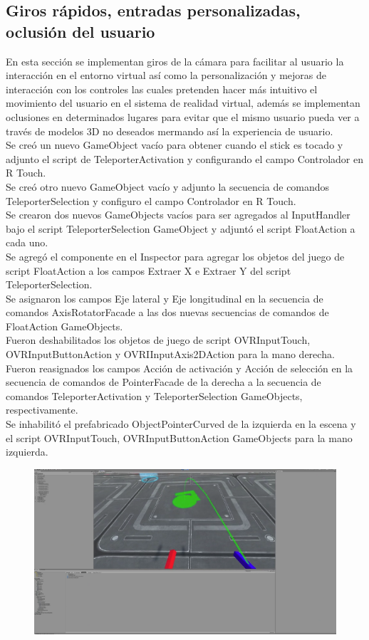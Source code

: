 \subsection{Giros rápidos, entradas personalizadas, oclusión del usuario}
En esta sección se implementan giros de la cámara para facilitar al usuario la interacción en el entorno virtual así como la personalización y mejoras de interacción 
con los controles las cuales pretenden hacer más intuitivo el movimiento del usuario en el sistema de realidad virtual, además se implementan oclusiones en determinados 
lugares para evitar que el mismo usuario pueda ver a través de modelos 3D no deseados mermando así la experiencia de usuario.\\
Se creó un nuevo GameObject vacío para obtener  cuando el stick es tocado y adjunto el script de TeleporterActivation y configurando el campo Controlador en R Touch.\\
Se creó otro nuevo GameObject vacío y adjunto la secuencia de comandos TeleporterSelection y configuro el campo Controlador en R Touch.\\ 
Se crearon dos nuevos GameObjects vacíos para ser agregados al InputHandler bajo el script TeleporterSelection GameObject y  adjuntó el script FloatAction a cada uno.\\
Se agregó el componente en el Inspector para agregar los objetos del juego de script FloatAction a los campos Extraer X e Extraer Y del script TeleporterSelection.\\
Se asignaron los campos Eje lateral y Eje longitudinal en la secuencia de comandos AxisRotatorFacade a las dos nuevas secuencias de comandos de FloatAction GameObjects.\\
Fueron deshabilitados los objetos de juego de script OVRInputTouch, OVRInputButtonAction y OVRIInputAxis2DAction para la mano derecha.\\
Fueron reasignados los campos Acción de activación y Acción de selección en la secuencia de comandos de PointerFacade de la derecha a la secuencia de comandos 
TeleporterActivation y TeleporterSelection GameObjects, respectivamente.\\
Se inhabilitó el prefabricado ObjectPointerCurved de la izquierda en la escena y el script OVRInputTouch, OVRInputButtonAction GameObjects para la mano izquierda.\\
\begin{figure}[H]
	\begin{center}
 		\includegraphics[width = .5\textwidth]{source/images/image57.png}
	\end{center} 
\end{figure}

